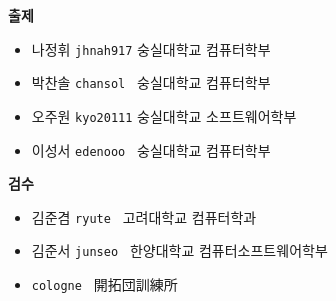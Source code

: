     \begin{frame}
        \textbf{출제} %
        \begin{itemize}
            \item 나정휘 \tabto{1.2cm} \texttt{jhnah917} \tabto{4cm} {\color{gray} } \tabto{8cm} {\color{gray} 숭실대학교 컴퓨터학부}
            \item 박찬솔 \tabto{1.2cm} \texttt{chansol } \tabto{4cm} {\color{gray} } \tabto{8cm} {\color{gray} 숭실대학교 컴퓨터학부}
            \item 오주원 \tabto{1.2cm} \texttt{kyo20111} \tabto{4cm} {\color{gray} } \tabto{8cm} {\color{gray} 숭실대학교 소프트웨어학부}
            \item 이성서 \tabto{1.2cm} \texttt{edenooo } \tabto{4cm} {\color{gray} } \tabto{8cm} {\color{gray} 숭실대학교 컴퓨터학부}
        \end{itemize}
        \vspace{3mm}
        \textbf{검수} %
        \begin{itemize}
            \item 김준겸 \tabto{1.2cm} \texttt{ryute   } \tabto{4cm} {\color{gray} } \tabto{8cm} {\color{gray} 고려대학교 컴퓨터학과}
            \item 김준서 \tabto{1.2cm} \texttt{junseo  } \tabto{4cm} {\color{gray} } \tabto{8cm} {\color{gray} 한양대학교 컴퓨터소프트웨어학부}
            \item {} \tabto{1.2cm} \texttt{cologne } \tabto{4cm} {\color{gray} } \tabto{8cm} {\color{gray} 開拓団訓練所}
        \end{itemize}
    \end{frame}
    
